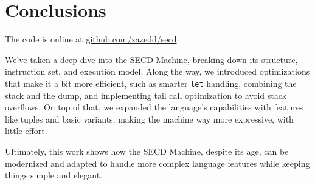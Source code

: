 \section{Conclusions}
The code is online at \href{https://github.com/zazedd/secd}{github.com/zazedd/secd}.

We’ve taken a deep dive into the SECD Machine, 
breaking down its structure, instruction set, and execution model. 
Along the way, we introduced optimizations that make it a bit more efficient, 
such as smarter \texttt{let} handling, combining the stack and the dump, 
and implementing tail call optimization to avoid stack overflows.
On top of that, we expanded the language's capabilities with features like tuples and basic variants, 
making the machine way more expressive, with little effort.

Ultimately, this work shows how the SECD Machine, despite its age, 
can be modernized and adapted to handle more complex language features 
while keeping things simple and elegant. 
